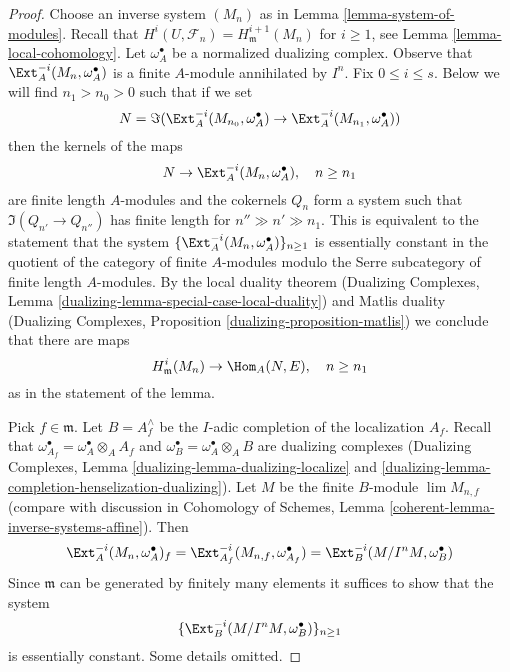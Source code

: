 \begin{proof}
Choose an inverse system $(M_n)$ as in Lemma \ref{lemma-system-of-modules}.
Recall that $H^i(U, \mathcal{F}_n) = H^{i + 1}_\mathfrak m(M_n)$ for
$i \geq 1$, see Lemma \ref{lemma-local-cohomology}.
Let $\omega_A^\bullet$ be a normalized dualizing complex.
Observe that $\Ext^{-i}_A(M_n, \omega_A^\bullet)$ is a finite $A$-module
annihilated by $I^n$. Fix $0 \leq i \leq s$.
Below we will find $n_1 > n_0 > 0$ such that if we set
$$
N = \Im(\Ext^{-i}_A(M_{n_0}, \omega_A^\bullet) \to
\Ext^{-i}_A(M_{n_1}, \omega_A^\bullet))
$$
then the kernels of the maps
$$
N \to \Ext^{-i}_A(M_n, \omega_A^\bullet),\quad n \geq n_1
$$
are finite length $A$-modules and the cokernels $Q_n$ form a
system such that $\Im(Q_{n'} \to Q_{n''})$ has finite length
for $n'' \gg n' \gg n_1$. This is equivalent to the statement that
the system $\{\Ext^{-i}_A(M_n, \omega_A^\bullet)\}_{n \geq 1}$
is essentially constant in the quotient of the category of finite
$A$-modules modulo the Serre subcategory of finite length $A$-modules.
By the local duality theorem
(Dualizing Complexes, Lemma \ref{dualizing-lemma-special-case-local-duality})
and Matlis duality
(Dualizing Complexes, Proposition \ref{dualizing-proposition-matlis})
we conclude that there are maps
$$
H^i_\mathfrak m(M_n) \to \Hom_A(N, E),\quad n \geq n_1
$$
as in the statement of the lemma.

\medskip\noindent
Pick $f \in \mathfrak m$. Let $B = A_f^\wedge$ be the $I$-adic completion
of the localization $A_f$. Recall that
$\omega_{A_f}^\bullet = \omega_A^\bullet \otimes_A A_f$
and $\omega_B^\bullet = \omega_A^\bullet \otimes_A B$ are dualizing
complexes (Dualizing Complexes, Lemma \ref{dualizing-lemma-dualizing-localize}
and \ref{dualizing-lemma-completion-henselization-dualizing}).
Let $M$ be the finite $B$-module $\lim M_{n, f}$ (compare with
discussion in Cohomology of Schemes, Lemma
\ref{coherent-lemma-inverse-systems-affine}). Then
$$
\Ext^{-i}_A(M_n, \omega_A^\bullet)_f =
\Ext^{-i}_{A_f}(M_{n, f}, \omega_{A_f}^\bullet) =
\Ext^{-i}_B(M/I^n M, \omega_B^\bullet)
$$
Since $\mathfrak m$ can be generated by finitely many elements it
suffices to show that the system
$$
\{\Ext^{-i}_B(M/I^n M, \omega_B^\bullet)\}_{n \geq 1}
$$
is essentially constant. Some details omitted.


\end{proof}
